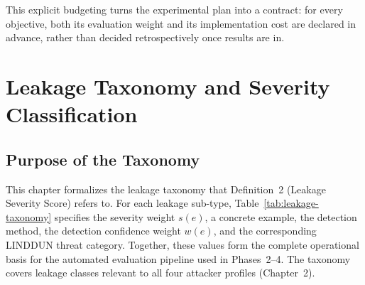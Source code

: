 \documentclass[a4paper,12pt]{report}
\begin{document}
This explicit budgeting turns the experimental plan into a contract: for
every objective, both its evaluation weight and its implementation cost
are declared in advance, rather than decided retrospectively once results
are in.


\chapter{Leakage Taxonomy and Severity Classification}

\section{Purpose of the Taxonomy}

This chapter formalizes the leakage taxonomy that Definition~2
(Leakage Severity Score) refers to. For each leakage sub-type,
Table~\ref{tab:leakage-taxonomy} specifies the severity weight $s(e)$, a
concrete example, the detection method, the detection confidence weight
$w(e)$, and the corresponding LINDDUN threat category. Together, these
values form the complete operational basis for the automated evaluation
pipeline used in Phases~2--4. The taxonomy covers leakage classes
relevant to all four attacker profiles (Chapter~2).

\vspace{0.4cm}
\end{document}

